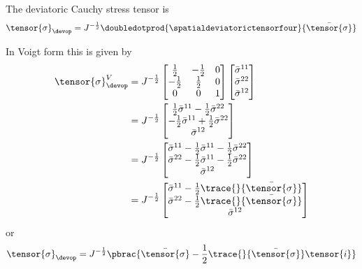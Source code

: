 The deviatoric Cauchy stress tensor is
\begin{equation}
  \tensor{\sigma}_{\devop}=J^{-\frac{1}{2}}\doubledotprod{\spatialdeviatorictensorfour}{\bar{\tensor{\sigma}}}
\end{equation}

In Voigt form this is given by
\begin{equation}
  \begin{split}
    \tensor{\sigma}_{\devop}^{V}&=J^{-\frac{1}{2}}\begin{bmatrix}
      \frac{1}{2} & -\frac{1}{2} & 0 \\
      -\frac{1}{2} & \frac{1}{2} & 0 \\
      0 & 0 & 1
    \end{bmatrix}\begin{bmatrix}
      \bar{\sigma}^{11} \\
      \bar{\sigma}^{22} \\
      \bar{\sigma}^{12}
    \end{bmatrix} \\
    &=J^{-\frac{1}{2}}\begin{bmatrix}
    \frac{1}{2}\bar{\sigma}^{11}-\frac{1}{2}\bar{\sigma}^{22} \\
    -\frac{1}{2}\bar{\sigma}^{11}+\frac{1}{2}\bar{\sigma}^{22} \\
    \bar{\sigma}^{12}
    \end{bmatrix}\\
    &=J^{-\frac{1}{2}}\begin{bmatrix}
    \bar{\sigma}^{11}-\frac{1}{2}\bar{\sigma}^{11}-\frac{1}{2}\bar{\sigma}^{22} \\
    \bar{\sigma}^{22}-\frac{1}{2}\bar{\sigma}^{11}-\frac{1}{2}\bar{\sigma}^{22} \\
    \bar{\sigma}^{12}
    \end{bmatrix}\\
    &=J^{-\frac{1}{2}}\begin{bmatrix}
    \bar{\sigma}^{11}-\frac{1}{2}\trace{}{\bar{\tensor{\sigma}}} \\
    \bar{\sigma}^{22}-\frac{1}{2}\trace{}{\bar{\tensor{\sigma}}}\\
    \bar{\sigma}^{12}
    \end{bmatrix}
  \end{split}
\end{equation}
or
\begin{equation}
  \tensor{\sigma}_{\devop}=J^{-\frac{1}{2}}\pbrac{\bar{\tensor{\sigma}}-\frac{1}{2}\trace{}{\bar{\tensor{\sigma}}}\tensor{i}}
\end{equation}

